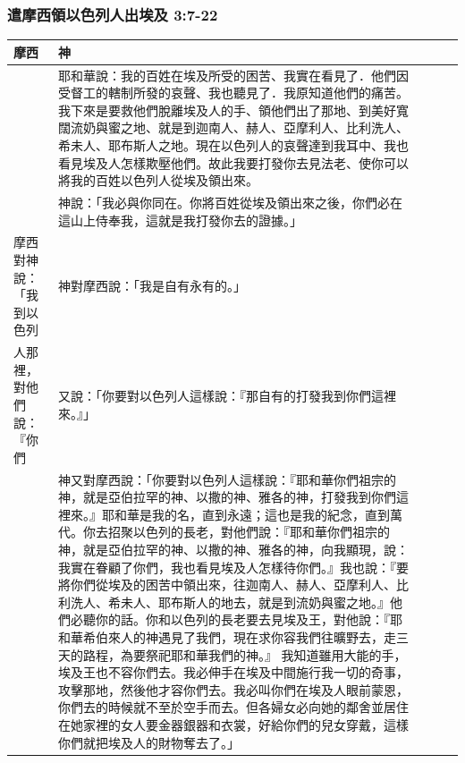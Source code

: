 \subsubsection{遣摩西領以色列人出埃及 3:7-22}
\begin{table}[H]
\begin{threeparttable}
\begin{tabular}{@{}p{}*{4}{L{\tabcolsep\relax}}@{}}
\toprule
摩西 &  神 \\\hline
&耶和華說：我的百姓在埃及所受的困苦、我實在看見了．他們因受督工的轄制所發的哀聲、我也聽見了．我原知道他們的痛苦。我下來是要救他們脫離埃及人的手、領他們出了那地、到美好寬闊流奶與蜜之地、就是到迦南人、赫人、亞摩利人、比利洗人、希未人、耶布斯人之地。現在以色列人的哀聲達到我耳中、我也看見埃及人怎樣欺壓他們。故此我要打發你去見法老、使你可以將我的百姓以色列人從埃及領出來。\tabularnewline \hline
\vspace{-.6cm}{摩西對神說：「我是什麼人?竟能去見法老,將以色列人從埃及領出來呢?」}&神說：「我必與你同在。你將百姓從埃及領出來之後，你們必在這山上侍奉我，這就是我打發你去的證據。」\tabularnewline \hline
摩西對神說：「我到以色列&神對摩西說：「我是自有永有的。」\tabularnewline
人那裡，對他們說：『你們&又說：「你要對以色列人這樣說：『那自有的打發我到你們這裡來。』」\tabularnewline
\vspace{-3cm}{祖宗的神打發我到你們這裡來。』他們若問我說：『他叫什麼名字？』我要對他們說什麼呢？」}&神又對摩西說：「你要對以色列人這樣說：『耶和華你們祖宗的神，就是亞伯拉罕的神、以撒的神、雅各的神，打發我到你們這裡來。』耶和華是我的名，直到永遠；這也是我的紀念，直到萬代。你去招聚以色列的長老，對他們說：『耶和華你們祖宗的神，就是亞伯拉罕的神、以撒的神、雅各的神，向我顯現，說：我實在眷顧了你們，我也看見埃及人怎樣待你們。』我也說：『要將你們從埃及的困苦中領出來，往迦南人、赫人、亞摩利人、比利洗人、希未人、耶布斯人的地去，就是到流奶與蜜之地。』他們必聽你的話。你和以色列的長老要去見埃及王，對他說：『耶和華希伯來人的神遇見了我們，現在求你容我們往曠野去，走三天的路程，為要祭祀耶和華我們的神。』 我知道雖用大能的手，埃及王也不容你們去。我必伸手在埃及中間施行我一切的奇事，攻擊那地，然後他才容你們去。我必叫你們在埃及人眼前蒙恩，你們去的時候就不至於空手而去。但各婦女必向她的鄰舍並居住在她家裡的女人要金器銀器和衣裳，好給你們的兒女穿戴，這樣你們就把埃及人的財物奪去了。」\tabularnewline
\hline
\bottomrule
\end{tabular}
\end{threeparttable}
\end{table} 


